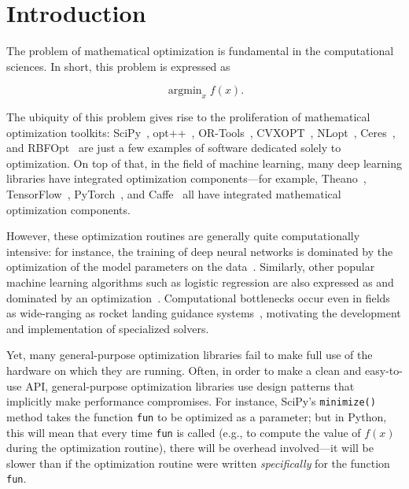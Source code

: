\section{Introduction}
\label{sec:introduction}

The problem of mathematical optimization is fundamental in the computational
sciences.  In short, this problem is expressed as

\begin{equation}
\operatorname{argmin}_x f(x).
\end{equation}

The ubiquity of this problem gives rise to the proliferation of mathematical
optimization toolkits: SciPy~\cite{2019arXiv190710121V},
opt++~\cite{meza1994opt++},
OR-Tools~\cite{ortools}, CVXOPT~\cite{vandenberghe2010cvxopt},
NLopt~\cite{johnson2014nlopt}, Ceres~\cite{ceres-solver},
and RBFOpt~\cite{costa2018rbfopt} are just a few examples of software dedicated
solely to optimization.  On top of that, in the field of machine learning, many
deep learning libraries have integrated optimization
components---for example, Theano~\cite{2016arXiv160502688full},
TensorFlow~\cite{tensorflow2015-whitepaper}, PyTorch~\cite{NEURIPS2019_9015},
and Caffe~\cite{jia2014caffe} all have integrated mathematical optimization
components.

However, these optimization routines are generally quite computationally
intensive: for instance, the training of deep neural networks is dominated by
the optimization of the model parameters on the
data~\cite{krizhevsky2012imagenet, lauzon2012introduction}.  Similarly,
other popular machine learning algorithms such as logistic regression are also
expressed as and dominated by an optimization~\cite{zhang2004solving,
manogaran2018health}.  Computational bottlenecks occur even in fields as
wide-ranging as rocket landing guidance systems~\cite{dueri2016customized},
motivating the development and implementation of specialized solvers.

Yet, many general-purpose optimization libraries fail to make full use of the
hardware on which they are running.  Often, in order to make a clean and
easy-to-use API, general-purpose optimization libraries use design patterns that
implicitly make performance compromises.  For instance, SciPy's {\tt minimize()}
method takes the function {\tt fun} to be optimized as a parameter; but in
Python, this will mean that every time {\tt fun} is called (e.g., to compute the
value of $f(x)$ during the optimization routine), there will be overhead
involved---it will be slower than if the optimization routine were written {\it
specifically} for the function {\tt fun}.

